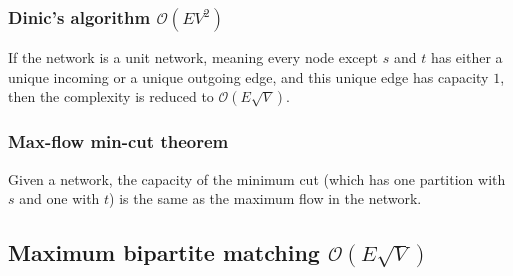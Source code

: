 \subsubsection{Dinic's algorithm $\mathcal O(EV^2)$}
If the network is a unit network, meaning every node except $s$ and $t$ has either a unique incoming or a unique outgoing edge, and this unique edge has capacity $1$, then the complexity is reduced to $\mathcal O(E\sqrt V)$.

\subsubsection{Max-flow min-cut theorem}
Given a network, the capacity of the minimum cut (which has one partition with $s$ and one with $t$) is the same as the maximum flow in the network.



\subsection{Maximum bipartite matching $\mathcal O(E\sqrt V)$}

